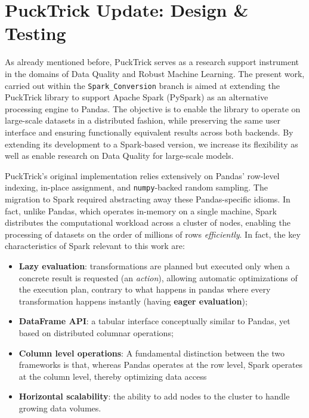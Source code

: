 \documentclass[../main.tex]{subfiles}
\begin{document}
\chapter{PuckTrick Update: \newline Design \& Testing}
\label{chap:oth}

As already mentioned before, PuckTrick serves as a research support instrument in the domains of Data Quality and Robust Machine Learning.  The present work, carried out within the \texttt{Spark\_Conversion} branch is aimed at extending the PuckTrick library to support Apache Spark (PySpark) as an alternative processing engine to Pandas. The objective is to enable the library to operate on large-scale datasets in a distributed fashion, while preserving the same user interface and ensuring functionally equivalent results across both backends. By extending its development to a Spark-based version, we increase its flexibility as well as enable research on Data Quality for large-scale models.

PuckTrick's original implementation relies extensively on Pandas' row-level indexing, in-place assignment, and \texttt{numpy}-backed random sampling.  The migration to Spark required abstracting away these Pandas-specific idioms. In fact, unlike Pandas, which operates in-memory on a single machine, Spark distributes the computational workload across a cluster of nodes, enabling the processing of datasets on the order of millions of rows \emph{efficiently}. In fact, the key characteristics of Spark relevant to this work are:
\begin{itemize}
    \item \textbf{Lazy evaluation}: transformations are planned but executed only when a concrete result is requested (an \emph{action}), allowing automatic optimizations of the execution plan, contrary to what happens in pandas where every transformation happens instantly (having \textbf{eager evaluation});
    \item \textbf{DataFrame API}: a tabular interface conceptually similar to Pandas, yet based on distributed columnar operations;
    \item \textbf{Column level operations}: A fundamental distinction between the two frameworks is that, whereas Pandas operates at the row level, Spark operates at the column level, thereby optimizing data access 
    \item \textbf{Horizontal scalability}: the ability to add nodes to the cluster to handle growing data volumes.
\end{itemize}
\end{document}
